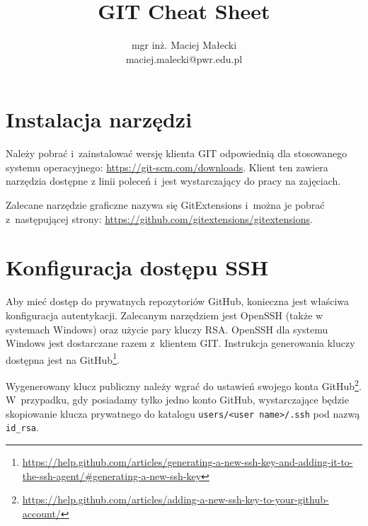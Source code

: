 \documentclass[12pt]{article}
\title{GIT Cheat Sheet}
\author{mgr inż. Maciej Małecki\\ \small maciej.malecki@pwr.edu.pl}
\begin{document}
    \maketitle
    
    \section*{Instalacja narzędzi}
        Należy pobrać i~zainstalować wersję klienta GIT odpowiednią dla stosowanego systemu operacyjnego: \url{https://git-scm.com/downloads}.
        Klient ten zawiera narzędzia dostępne z linii poleceń i~jest wystarczający do pracy na zajęciach.

        Zalecane narzędzie graficzne nazywa się GitExtensions i~można je pobrać z~następującej strony: \url{https://github.com/gitextensions/gitextensions}.

    \section*{Konfiguracja dostępu SSH}
        Aby mieć dostęp do prywatnych repozytoriów GitHub, konieczna jest właściwa konfiguracja autentykacji. Zalecanym narzędziem jest OpenSSH (także w systemach Windows) oraz użycie pary kluczy RSA. OpenSSH dla systemu Windows jest dostarczane razem z~klientem GIT. Instrukcja generowania kluczy dostępna jest na GitHub\footnote{\url{https://help.github.com/articles/generating-a-new-ssh-key-and-adding-it-to-the-ssh-agent/\#generating-a-new-ssh-key}}.

        Wygenerowany klucz publiczny należy wgrać do ustawień swojego konta GitHub\footnote{\url{https://help.github.com/articles/adding-a-new-ssh-key-to-your-github-account/}}. W~przypadku, gdy posiadamy tylko jedno konto GitHub, wystarczające będzie skopiowanie klucza prywatnego do katalogu \texttt{users/<user name>/.ssh} pod nazwą \texttt{id\_rsa}.
\end{document}

